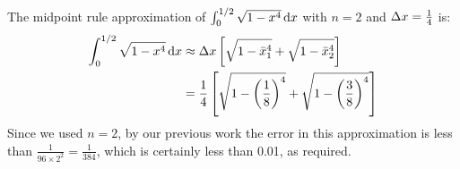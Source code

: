 \begin{solution}
The midpoint rule approximation of $\int_0^{1/2}\sqrt{1-x^4}\,\mathrm{d}x$ with $n=2$ and $\Delta x = \frac{1}{4}$ is:
\begin{align*}
\int_0^{1/2}\sqrt{1-x^4}\,\mathrm{d}x&\approx\Delta x\left[\sqrt{1-\bar x_1^4} + \sqrt{1-\bar x_2^4}\right]\\
&= \frac{1}{4}\left[\sqrt{1-\left(\frac18\right)^4} +
 \sqrt{1-\left(\frac38\right)^4}\right]
\end{align*}
Since we used $n=2$, by our previous work the error in this approximation is less than $\frac{1}{96\times 2^2} = \frac{1}{384}$, which is certainly less than 0.01, as required.
\end{solution}
